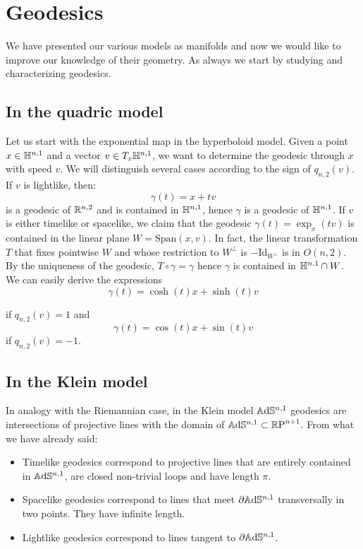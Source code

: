 \section{Geodesics}
We have presented our various models as manifolds and now we would like to improve our knowledge of their geometry. As always we start by studying and characterizing geodesics.\\ 

\subsection{In the quadric model} Let us start with the exponential map in the hyperboloid model. Given a point $x\in \mathbb{H}^{n,1}$ and a vector $v\in T_x\mathbb{H}^{n,1}$, we want to determine the geodesic through $x$ with speed $v$. We will distinguish several cases according to the sign of $ q_{n,2}(v)$. If $v$ is lightlike, then: 
\[
    \gamma(t)=x+tv
\] is a geodesic of $\mathbb{R}^{n,2}$ and is contained in $\mathbb{H}^{n,1}$, hence $\gamma$ is a geodesic of $\mathbb{H}^{n,1}$. If $v$ is either timelike or spacelike, we claim that the geodesic $\gamma(t)=\exp_x(tv)$ is contained in the linear plane $W=\text{Span}(x,v).$ In fact, the linear transformation $T$ that fixes pointwise $W$ and whose restriction to $W^\perp$ is $-\text{Id}_{W^\perp}$ is in $O(n,2)$. By the uniqueness of the geodesic, $T\circ\gamma=\gamma$ hence $\gamma$ is contained in $\mathbb{H}^{n,1}\cap W$. We can easily derive the expressions\\
\begin{equation}
    \gamma(t)=\cosh(t)x+\sinh(t)v
\end{equation}

if $q_{n,2}(v)=1$ and 
\begin{equation}\label{212}
    \gamma(t)=\cos(t)x+\sin(t)v
\end{equation}
if $q_{n,2}(v)=-1$.\\

\subsection{In the Klein model} In analogy with the Riemannian case, in the Klein model $\mathbb{A}\mathrm{d}\mathbb{S}^{n,1}$ geodesics are intersections of projective lines with the domain of $\mathbb{A}\mathrm{d}\mathbb{S}^{n,1}\subset\mathbb{R} \text{P}^{n+1}.$ From what we have already said: 
\begin{itemize}
    \item Timelike geodesics correspond to projective lines that are entirely contained in $\mathbb{A}\mathrm{d}\mathbb{S}^{n,1}$, are closed non-trivial loops and have length $\pi.$ 
    \item Spacelike geodesics correspond to lines that meet $\partial \mathbb{A}\mathrm{d}\mathbb{S}^{n,1}$ transversally in two points. They have infinite length.
    \item Lightlike geodesics correspond to lines tangent to $\partial\mathbb{A}\mathrm{d}\mathbb{S}^{n,1}$.   
\end{itemize}

